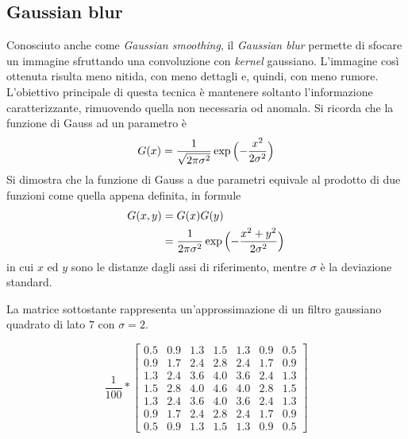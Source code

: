 \clearpage
\subsection {Gaussian blur} 
Conosciuto anche come \textit{Gaussian smoothing}, il \textit{Gaussian blur} permette di sfocare un immagine sfruttando una convoluzione con \textit{kernel} gaussiano.
L'immagine così ottenuta risulta meno nitida, con meno dettagli e, quindi, con meno rumore.
L'obiettivo principale di questa tecnica è mantenere soltanto l'informazione caratterizzante, rimuovendo quella non necessaria od anomala.
Si ricorda che la funzione di Gauss ad un parametro è
\begin{equation*}
  G(x) = \frac{1}{\sqrt{2\pi\sigma^2}}
         \exp{\Bigl(- \frac{ x^2 }{ 2 \sigma^2 } \Bigr)} 
\end{equation*}
Si dimostra che la funzione di Gauss a due parametri equivale al prodotto di due funzioni come quella appena definita, in formule
\begin{equation*}
  \begin{split}
    G(x,y) & = G(x)G(y) \\
           & = \frac{1}{2\pi\sigma^2}
               \exp{\Bigl(- \frac{ x^2 + y^2 }{ 2 \sigma^2 } \Bigr)} 
  \end{split}
\end{equation*}
in cui $x$ ed $y$ sono le distanze dagli assi di riferimento, mentre $\sigma$ è la deviazione standard.
% 
% 

La matrice sottostante rappresenta un'approssimazione di un filtro gaussiano quadrato di lato $7$ con $\sigma = 2$.

\begin{equation*} %
  \frac{1}{100}*
  \begin{bmatrix}

    0.5 & 0.9 & 1.3 & 1.5 & 1.3 & 0.9 & 0.5\\
    0.9 & 1.7 & 2.4 & 2.8 & 2.4 & 1.7 & 0.9\\
    1.3 & 2.4 & 3.6 & 4.0 & 3.6 & 2.4 & 1.3\\
    1.5 & 2.8 & 4.0 & 4.6 & 4.0 & 2.8 & 1.5\\
    1.3 & 2.4 & 3.6 & 4.0 & 3.6 & 2.4 & 1.3\\
    0.9 & 1.7 & 2.4 & 2.8 & 2.4 & 1.7 & 0.9\\
    0.5 & 0.9 & 1.3 & 1.5 & 1.3 & 0.9 & 0.5

  \end{bmatrix}
\end{equation*}
\label{eq:gauss_kernel}

